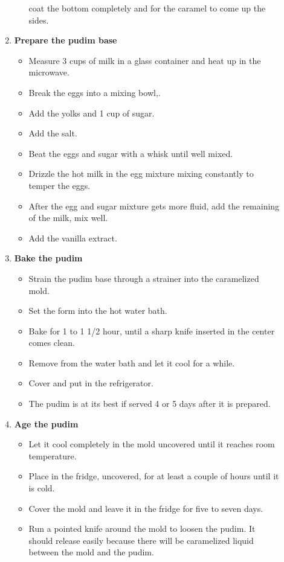\documentclass [11pt, letterpaper] {article}
\begin{document}
\begin{description}
\begin{enumerate}
\begin{itemize}
coat the bottom completely and for the caramel to come up the sides.
	\end{itemize}
	\item {\bf Prepare the pudim base}
	\begin{itemize}
	\item Measure 3 cups of milk in a glass container and
heat up in the microwave.
	\item Break the eggs into a mixing bowl,.
	\item Add the yolks and 1 cup of sugar.
	\item Add the salt.
        \item Beat the eggs and sugar with a whisk until well mixed.
	\item Drizzle the hot milk in the egg mixture mixing constantly
to temper the eggs.
	\item After the egg and sugar mixture gets more fluid, add the
remaining of the milk, mix well.
	\item Add the vanilla extract.
	\end{itemize}
	\item {\bf Bake the pudim}
	\begin{itemize}
	\item Strain the pudim base through a strainer into the
              caramelized mold.
	\item Set the form into the hot water bath.
	\item Bake for 1 to 1 1/2 hour, until a sharp knife inserted in
              the center comes clean.
	\item Remove from the water bath and let it cool for a while.
	\item Cover and put in the refrigerator.
	\item The pudim is at its best if served 4 or 5 days after it
	      is prepared.
	\end{itemize}
	\item {\bf Age the pudim}
	\begin{itemize}
	\item Let it cool completely in the mold uncovered until it reaches room temperature.
	\item Place in the fridge, uncovered, for at least a couple of hours until it is cold.
	\item Cover the mold and leave it in the fridge for five to seven days.
	\item Run a pointed knife around the mold to loosen the pudim. It should release easily because there will be caramelized liquid between the mold and the pudim.

\end{itemize}
\end{enumerate}
\end{description}
\end{document}
